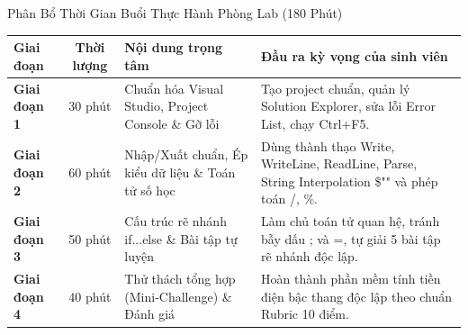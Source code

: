 \documentclass[aspectratio=169, 10pt]{beamer}
\begin{document}
\begin{frame}{Phân Bổ Thời Gian Buổi Thực Hành Phòng Lab (180 Phút)}
  \begin{table}[h]
    \centering
    \small
    \begin{tabularx}{\textwidth}{lcp{4.5cm}X}
      \toprule
      \textbf{Giai đoạn} & \textbf{Thời lượng} & \textbf{Nội dung trọng tâm} & \textbf{Đầu ra kỳ vọng của sinh viên} \\
      \midrule
      \textbf{Giai đoạn 1} & 30 phút & Chuẩn hóa Visual Studio, Project Console \& Gỡ lỗi & Tạo project chuẩn, quản lý Solution Explorer, sửa lỗi Error List, chạy Ctrl+F5. \\
      \addlinespace
      \textbf{Giai đoạn 2} & 60 phút & Nhập/Xuất chuẩn, Ép kiểu dữ liệu \& Toán tử số học & Dùng thành thạo Write, WriteLine, ReadLine, Parse, String Interpolation \$"" và phép toán /, \%. \\
      \addlinespace
      \textbf{Giai đoạn 3} & 50 phút & Cấu trúc rẽ nhánh if...else \& Bài tập tự luyện & Làm chủ toán tử quan hệ, tránh bẫy dấu ; và =, tự giải 5 bài tập rẽ nhánh độc lập. \\
      \addlinespace
      \textbf{Giai đoạn 4} & 40 phút & Thử thách tổng hợp (Mini-Challenge) \& Đánh giá & Hoàn thành phần mềm tính tiền điện bậc thang độc lập theo chuẩn Rubric 10 điểm. \\
      \bottomrule
    \end{tabularx}
  \end{table}
\end{frame}
\end{document}
